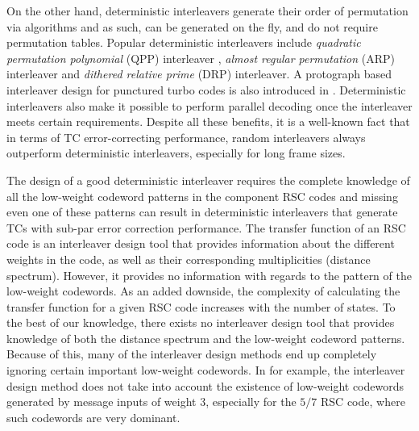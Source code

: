 On the other hand, deterministic interleavers generate their order of 
permutation via \newline algorithms and as such, can be generated on the fly, and do not require permutation tables. 
Popular deterministic interleavers include \textit{quadratic permutation polynomial} (QPP) interleaver \cite{ref5}, \textit{almost regular permutation} (ARP) interleaver \cite{ref6} and \textit{dithered relative prime} (DRP) interleaver. A protograph based interleaver design for punctured turbo codes is also introduced in \cite{ref7}. 
Deterministic interleavers also make it possible to perform parallel decoding once the interleaver meets certain requirements. Despite all these benefits, it is a well-known fact that in terms of TC error-correcting performance, random interleavers always outperform deterministic interleavers, especially for long frame sizes.

The design of a good deterministic interleaver requires the complete knowledge of all the low-weight codeword patterns in the component RSC codes and missing even one of these patterns can result in deterministic interleavers that generate TCs with sub-par error correction performance.
The transfer function of an RSC code is an interleaver design tool that provides information about the different weights in the code, as well as their corresponding multiplicities (distance spectrum). However, it provides no information with regards to the pattern of the low-weight codewords. As an added downside, the complexity of calculating the transfer function for a given RSC code increases with the number of states. To the best of our knowledge, there exists no interleaver design tool that provides knowledge of both the distance spectrum and the low-weight codeword patterns. Because of this, many of the interleaver design methods end up completely ignoring certain important low-weight codewords. In \cite{ref5} for example, the interleaver design method does not take into account the existence of low-weight codewords generated by message inputs of weight 3, especially for the $5/7$  RSC code, where such codewords are very dominant.

